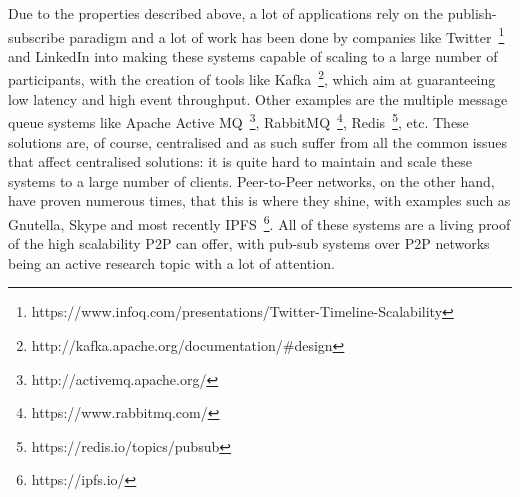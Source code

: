 Due to the properties described above, a lot of applications rely on the
publish-subscribe paradigm and a lot of work has been done by companies like
Twitter~\footnote{https://www.infoq.com/presentations/Twitter-Timeline-Scalability}
and LinkedIn into making these systems capable of scaling to a large number of
participants, with the creation of tools like
Kafka~\footnote{http://kafka.apache.org/documentation/\#design}, which aim at
guaranteeing low latency and high event throughput. Other examples are the
multiple message queue systems like Apache Active
MQ~\footnote{http://activemq.apache.org/},
RabbitMQ~\footnote{https://www.rabbitmq.com/},
Redis~\footnote{https://redis.io/topics/pubsub}, etc.  These solutions are, of
course, centralised and as such suffer from all the common issues that affect
centralised solutions: it is quite hard to maintain and scale these systems to
a large number of clients. Peer-to-Peer networks, on the other hand, have
proven numerous times, that this is where they shine, with examples such as
Gnutella, Skype and most recently IPFS~\footnote{https://ipfs.io/}.  All of
these systems are a living proof of the high scalability P2P can offer, with
pub-sub systems over P2P networks being an active research topic with a lot of
attention.
